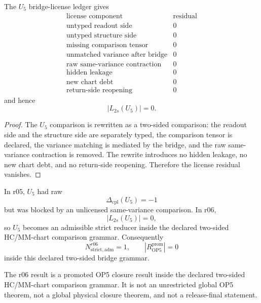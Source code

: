 \begin{proposition}
The \(U_5\) bridge-license ledger gives
\[
\begin{array}{c|r}
\text{license component} & \text{residual}\\
\hline
\text{untyped readout side} & 0\\
\text{untyped structure side} & 0\\
\text{missing comparison tensor} & 0\\
\text{unmatched variance after bridge} & 0\\
\text{raw same-variance contraction} & 0\\
\text{hidden leakage} & 0\\
\text{new chart debt} & 0\\
\text{return-side reopening} & 0
\end{array}
\]
and hence
\[
    |L_{2s}(U_5)|=0.
\]
\end{proposition}

\begin{proof}
The \(U_5\) comparison is rewritten as a two-sided comparison: the readout
side and the structure side are separately typed, the comparison tensor is
declared, the variance matching is mediated by the bridge, and the raw
same-variance contraction is removed.  The rewrite introduces no hidden
leakage, no new chart debt, and no return-side reopening.  Therefore the
license residual vanishes.
\end{proof}

\begin{theorem}
In r05, \(U_5\) had raw
\[
    \Delta_{\mathrm{cpl}}(U_5)=-1
\]
but was blocked by an unlicensed same-variance comparison.  In r06,
\[
    |L_{2s}(U_5)|=0,
\]
so \(U_5\) becomes an admissible strict reducer inside the declared two-sided
HC/MM-chart comparison grammar.  Consequently
\[
    N_{\mathrm{strict,adm}}^{r06}=1,
    \qquad
    |R_{\mathrm{OP5}}^{\mathrm{prom}}|=0
\]
inside this declared two-sided bridge grammar.
\end{theorem}

\begin{remark}
The r06 result is a promoted OP5 closure result inside the declared two-sided
HC/MM-chart comparison grammar.  It is not an unrestricted global OP5 theorem,
not a global physical closure theorem, and not a release-final statement.
\end{remark}


